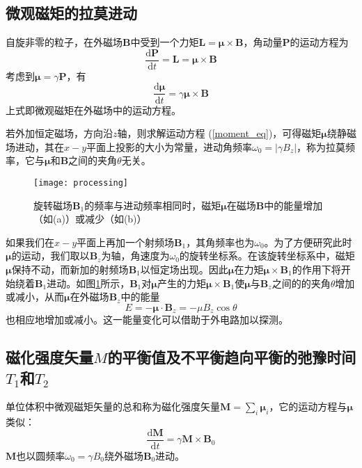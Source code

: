 \documentclass[aps,pre,12pt,preprint,onecolumn,showpacs,showkeys]{revtex4-1}
\def \d {\mathrm d}
\begin{document}
\subsection{微观磁矩的拉莫进动}
自旋非零的粒子，在外磁场$\bm{B}$中受到一个力矩$\bm{L}=\bm{\mu}\times \bm{B}$，角动量$\bm{P}$的运动方程为
$$\frac{\d \bm{P}}{\d t}=\bm{L}=\bm{\mu}\times \bm{B}$$
考虑到$\bm{\mu}=\gamma \bm{P}$，有
\begin{equation}
\frac{\d \bm{\mu}}{\d t}=\gamma \bm{\mu} \times \bm{B}\label{moment_eq}
\end{equation}
上式即微观磁矩在外磁场中的运动方程。

若外加恒定磁场，方向沿$z$轴，则求解运动方程 (\ref{moment_eq})，可得磁矩$\bm{\mu}$绕静磁场进动，其在$x-y$平面上投影的大小为常量，进动角频率$\omega_0=|\gamma B_z|$，称为拉莫频率，它与$\bm{\mu}$和$\bm{B}$之间的夹角$\theta$无关。

\begin{figure}[h]
\centering
\texttt{[image: processing]}
\caption{\label{fig:processing}%
旋转磁场$\bm{B}_1$的频率与进动频率相同时，磁矩$\bm{\mu}$在磁场$\bm{B}$中的能量增加（如(a)）或减少（如(b)）}
\end{figure}

如果我们在$x-y$平面上再加一个射频场$\bm{B}_1$，其角频率也为$\omega_0$。为了方便研究此时$\bm{\mu}$的运动，我们取以$\bm{B}_z$为轴，角速度为$\omega_0$的旋转坐标系。在该旋转坐标系中，磁矩$\bm{\mu}$保持不动，而新加的射频场$\bm {B}_1$以恒定场出现。因此$\bm{\mu}$在力矩$\bm{\mu}\times \bm{B}_1$的作用下将开始绕着$\bm{B}_1$进动。如图\ref{fig:processing}所示，$\bm{B}_1$对$\bm{\mu}$产生的力矩$\bm{\mu}\times \bm{B}_1$使$\bm{\mu}$与$\bm{B}_z$之间的的夹角$\theta$增加或减小，从而$\bm{\mu}$在外磁场$\bm{B}_z$中的能量
\begin{equation}
E=-\bm{\mu}\cdot \bm{B}_z=-\mu B_z \cos \theta
\end{equation}
也相应地增加或减小。这一能量变化可以借助于外电路加以探测。

\subsection{磁化强度矢量$M$的平衡值及不平衡趋向平衡的弛豫时间$T_1$和$T_2$}
单位体积中微观磁矩矢量的总和称为磁化强度矢量$\bm{M}=\sum_i\bm{\mu}_i$，它的运动方程与$\bm{\mu}$类似：
\begin{equation}
\frac{\d \bm{M}}{\d t}=\gamma \bm{M}\times \bm{B}_0
\end{equation}
$\bm{M}$也以圆频率$\omega_0 = \gamma B_0$绕外磁场$\bm{B}_0$进动。
\end{document}
